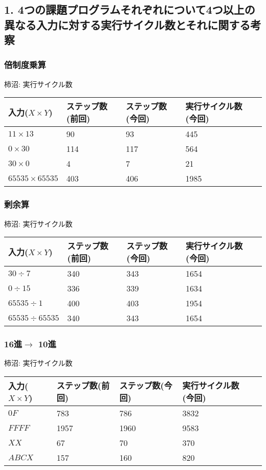 \documentclass{jsarticle}
\begin{document}
\subsection*{1. 4つの課題プログラムそれぞれについて4つ以上の異なる入力に対する実行サイクル数とそれに関する考察}

\subsubsection*{倍制度乗算}
柿沼:
実行サイクル数
\begin{table}[h]
  \begin{tabular}{|l|l|l|l|l|} \hline
    入力($X \times Y$) & ステップ数(前回) & ステップ数(今回) & 実行サイクル数(今回) \\ \hline
    $11 \times 13$ & 90 & 93 & 445\\ \hline
    $0 \times 30$ & 114 & 117 & 564 \\ \hline
    $30 \times 0$ & 4 & 7 & 21\\ \hline
    $65535 \times 65535$ & 403 & 406 & 1985 \\ \hline
  \end{tabular}
\end{table}

\subsubsection*{剰余算}
柿沼:
実行サイクル数
\begin{table}[h]
  \begin{tabular}{|l|l|l|l|l|} \hline
    入力($X \times Y$) & ステップ数(前回) & ステップ数(今回) & 実行サイクル数(今回) \\ \hline
    $30 \div 7$ & 340 & 343 & 1654 \\ \hline
    $0 \div 15$ & 336 & 339 & 1634 \\ \hline
    $65535 \div 1$ & 400 & 403 & 1954 \\ \hline
    $65535 \div 65535$ & 340 & 343 & 1654 \\ \hline
  \end{tabular}
\end{table}

\subsubsection*{16進$\rightarrow$ 10進}
柿沼:
実行サイクル数
\begin{table}[h]
  \begin{tabular}{|l|l|l|l|l|} \hline
    入力($X \times Y$) & ステップ数(前回) & ステップ数(今回) & 実行サイクル数(今回) \\ \hline
    $0F$ & 783 & 786 & 3832 \\ \hline
    $FFFF$ & 1957 & 1960 & 9583 \\ \hline
    $XX$ & 67 & 70 & 370 \\ \hline
    $ABCX$ & 157 & 160 & 820 \\ \hline
  \end{tabular}
\end{table}
\end{document}
